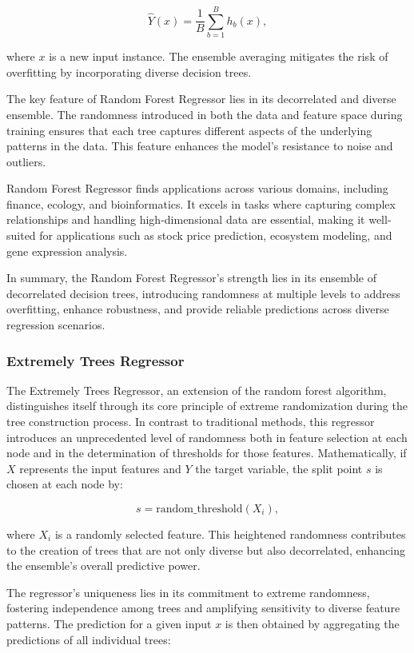 \documentclass[twocolumn]{article}
\begin{document}
\[ \hat{Y}(x) = \frac{1}{B} \sum_{b=1}^{B} h_b(x), \]

where \(x\) is a new input instance. The ensemble averaging mitigates the risk of overfitting by incorporating diverse decision trees.

The key feature of Random Forest Regressor lies in its decorrelated and diverse ensemble. The randomness introduced in both the data and feature space during training ensures that each tree captures different aspects of the underlying patterns in the data. This feature enhances the model's resistance to noise and outliers.

Random Forest Regressor finds applications across various domains, including finance, ecology, and bioinformatics. It excels in tasks where capturing complex relationships and handling high-dimensional data are essential, making it well-suited for applications such as stock price prediction, ecosystem modeling, and gene expression analysis.

In summary, the Random Forest Regressor's strength lies in its ensemble of decorrelated decision trees, introducing randomness at multiple levels to address overfitting, enhance robustness, and provide reliable predictions across diverse regression scenarios.
		
		\subsubsection{Extremely Trees Regressor}
The Extremely Trees Regressor, an extension of the random forest algorithm, distinguishes itself through its core principle of extreme randomization during the tree construction process. In contrast to traditional methods, this regressor introduces an unprecedented level of randomness both in feature selection at each node and in the determination of thresholds for those features. Mathematically, if \(X\) represents the input features and \(Y\) the target variable, the split point \(s\) is chosen at each node by:

\[ s = \text{random\_threshold}(X_i), \]

where \(X_i\) is a randomly selected feature. This heightened randomness contributes to the creation of trees that are not only diverse but also decorrelated, enhancing the ensemble's overall predictive power.

The regressor's uniqueness lies in its commitment to extreme randomness, fostering independence among trees and amplifying sensitivity to diverse feature patterns. The prediction for a given input \(x\) is then obtained by aggregating the predictions of all individual trees:
\end{document}
